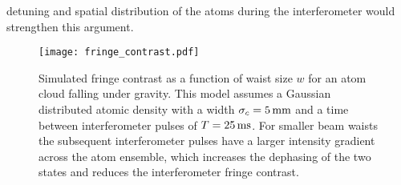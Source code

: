 detuning and spatial distribution of the atoms during the interferometer would
strengthen this argument.
\begin{figure}[!htbp][!ht]
	\centering
	\texttt{[image: fringe\_contrast.pdf]}
	\caption[Simulated fringe contrast vs beam waist size]{Simulated fringe
		contrast as a function of waist size \(w\) for an atom cloud falling under
		gravity. This model assumes a Gaussian distributed atomic density with a
		width \(\sigma_c = \sivalue{5}{\milli\metre}\) and a time between
		interferometer pulses of \(T = \sivalue{25}{\milli\second}\). For smaller
		beam waists the subsequent interferometer pulses have a larger intensity
		gradient across the atom ensemble, which increases the dephasing of the two
		states and reduces the interferometer fringe contrast.}
	\label{fig:raman_fringecontrast}
\end{figure}

